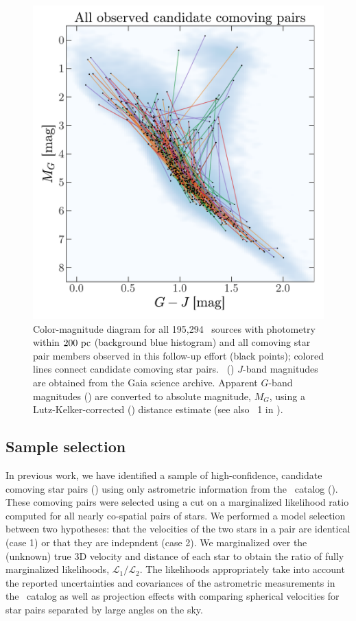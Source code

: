 \documentclass[modern, letterpaper]{aastex61}
\newcommand{\tgas}{\acronym{TGAS}}
\newcommand{\tmass}{\acronym{2MASS}}
\begin{document}
\begin{figure}[htb!]
  \begin{center}
    \includegraphics[width=0.8\linewidth]{sample_cmd.pdf}
  \end{center}
  \caption{%
    Color-magnitude diagram for all 195,294 \tgas\ sources with 
    photometry within $200~\mathrm{pc}$ (background blue histogram) and all comoving
    star pair members observed in this follow-up effort (black points); colored
    lines connect candidate comoving star pairs.
    \tmass\ (\citealt{Skrutskie:2006}) $J$-band magnitudes are obtained
    from the Gaia science archive.
    Apparent $G$-band magnitudes (\citealt{Carrasco:2016}) are converted to
    absolute magnitude, $M_G$, using a Lutz-Kelker-corrected
    (\citealt{Lutz:1973}) distance estimate (see also \eqname~1 in
    \citealt{Oh:2017}).
    \label{fig:sample-cmd}}
\end{figure}

\subsection{Sample selection}\label{sec:sample}

In previous work, we have identified a sample of high-confidence, candidate
comoving star pairs (\citealt{Oh:2017}) using only astrometric information from
the \tgas\ catalog (\citealt{Michalik:2015,Gaia-Collaboration:2016a}).
These comoving pairs were selected using a cut on a marginalized likelihood
ratio computed for all nearly co-spatial pairs of stars.
We performed a model selection between two hypotheses: that the velocities of
the two stars in a pair are identical (case 1) or that they are indepndent (case
2).
We marginalized over the (unknown) true 3D velocity and distance of each star to
obtain the ratio of fully marginalized likelihoods,
$\mathcal{L}_1/\mathcal{L}_2$.
The likelihoods appropriately take into account the reported uncertainties and
covariances of the astrometric measurements in the \tgas\ catalog as well as
projection effects with comparing spherical velocities for star pairs separated
by large angles on the sky.
\end{document}
